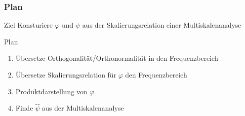 %
%
%
\begin{frame}
\frametitle{Plan}
\begin{block}{Ziel}
Konsturiere $\varphi$ und $\psi$ aus der Skalierungsrelation einer
Multiskalenanalyse
\end{block}

\begin{block}{Plan}
\begin{enumerate}
\item<2->
Übersetze Orthogonalität/Orthonormalität in den Frequenzbereich
\item<3->
Übersetze Skalierungsrelation für $\varphi$ den Frequenzbereich
\item<4->
Produktdarstellung von $\varphi$
\item<5->
Finde $\hat{\psi}$ aus der Multiskalenanalyse
\end{enumerate}
\end{block}

\end{frame}
